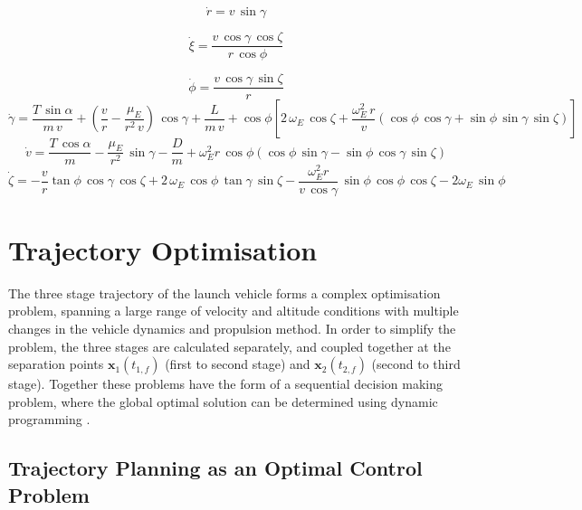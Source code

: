\documentclass[journal]{new-aiaa}
\begin{document}
\begin{equation}
\dot{r} = v \, \sin \gamma
\end{equation}

\begin{equation}
\dot{\xi} = \frac{v \, \cos \gamma \, \cos \zeta}{r \, \cos \phi}
\end{equation}

\begin{equation}
\dot{\phi} = \frac{v\,\cos\gamma\,\sin\zeta}{r}
\end{equation}
\begin{equation}
\dot{\gamma} = \frac{T\,\sin\alpha}{m\,v}+ (\frac{v}{r}-\frac{\mu_E}{r^2 \,v})\,\cos\gamma + \frac{L}{m\,v}
 + \cos\phi[2\,\omega_E\, \cos\zeta + \frac{\omega_E^2\, r}{v}(\cos\phi\,\cos\gamma+\sin\phi\,\sin\gamma\,\sin\zeta)]
 \end{equation}
\begin{equation}
\dot{v} = \frac{T\,\cos\alpha}{m}-\frac{\mu_E}{r^2}\,\sin\gamma - \frac{D}{m}
+ \omega_E^2 r\,\cos\phi(\cos\phi\,\sin\gamma-\sin\phi\,\cos\gamma\,\sin\zeta)
\end{equation}
\begin{equation}
\dot{\zeta} = -\frac{v}{r}\tan\phi\,\cos\gamma\,\cos\zeta +2\,\omega_E\,\cos\phi\,\tan\gamma\,\sin\zeta - \frac{\omega_E^2 r}{v\,\cos\gamma}\,\sin\phi \, \cos\phi\,\cos\zeta-2\omega_E\,\sin\phi 
\end{equation}


\section{Trajectory Optimisation} \label{section:optimisation}

The three stage trajectory of the launch vehicle forms a complex optimisation problem, spanning a large range of velocity and altitude conditions with multiple changes in the vehicle dynamics and propulsion method. In order to simplify the problem, the three stages are calculated separately, and coupled together at the separation points $\textbf{x}_1(t_{1,f})$ (first to second stage) and  $\textbf{x}_2(t_{2,f})$ (second to third stage). Together these problems have the form of a sequential decision making problem, where the global optimal solution can be determined using dynamic programming \cite{Bertsekas2005}. 



\subsection{Trajectory Planning as an Optimal Control Problem}
\end{document}

